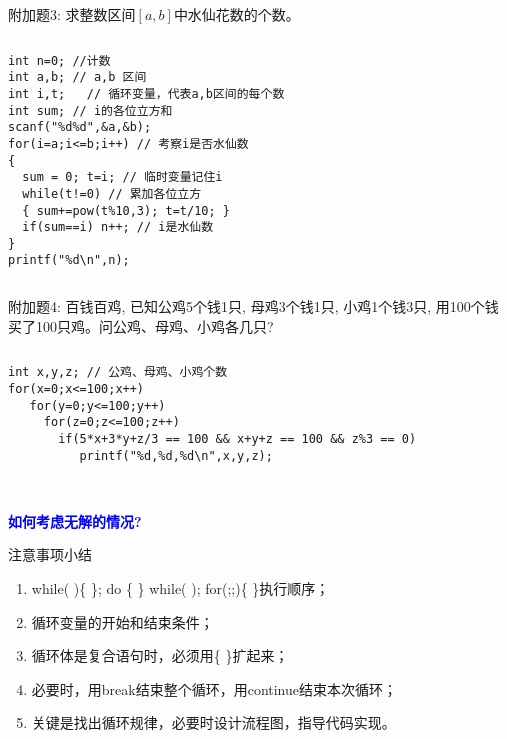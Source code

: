 \begin{frame}[fragile]
附加题3: 求整数区间$[a,b]$中水仙花数的个数。
\pause
\begin{columns}
\begin{lstlisting}
int n=0; //计数 
int a,b; // a,b 区间
int i,t;   // 循环变量，代表a,b区间的每个数
int sum; // i的各位立方和 
scanf("%d%d",&a,&b);
for(i=a;i<=b;i++) // 考察i是否水仙数
{  
  sum = 0; t=i; // 临时变量记住i
  while(t!=0) // 累加各位立方 
  { sum+=pow(t%10,3); t=t/10; }
  if(sum==i) n++; // i是水仙数 
}
printf("%d\n",n);
\end{lstlisting}
\end{columns}
\end{frame}

\begin{frame}[fragile]
附加题4: 百钱百鸡, 已知公鸡5个钱1只, 母鸡3个钱1只, 小鸡1个钱3只, 用100个钱买了100只鸡。问公鸡、母鸡、小鸡各几只? 
\pause
\begin{columns}
\begin{lstlisting}
int x,y,z; // 公鸡、母鸡、小鸡个数
for(x=0;x<=100;x++) 
   for(y=0;y<=100;y++) 
     for(z=0;z<=100;z++) 
       if(5*x+3*y+z/3 == 100 && x+y+z == 100 && z%3 == 0)  
          printf("%d,%d,%d\n",x,y,z);
\end{lstlisting}
\end{columns}
~\\
\pause
\textbf{\textcolor{blue}{如何考虑无解的情况?}}
\end{frame}

\begin{frame}{注意事项小结}
\begin{enumerate}
\setlength{\itemsep}{.5cm}
\item while( )\{ \}; do \{ \} while( ); for(;;)\{ \}执行顺序；
\item 循环变量的开始和结束条件；
\item 循环体是复合语句时，必须用\{ \}扩起来；
\item 必要时，用break结束整个循环，用continue结束本次循环；
\item 关键是找出循环规律，必要时设计流程图，指导代码实现。	
\end{enumerate}
\end{frame}